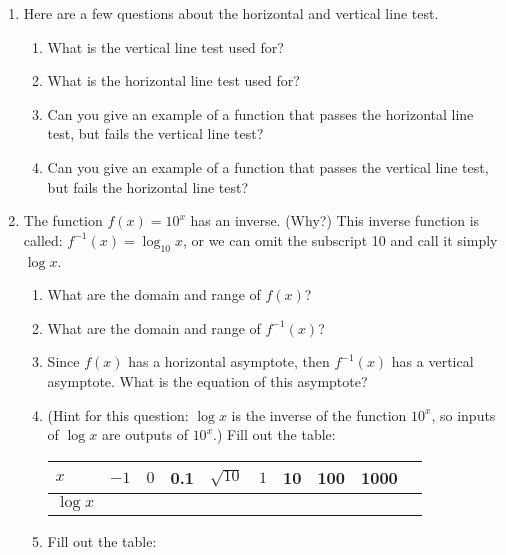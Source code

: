 \documentclass[11pt,dvipsnames]{article}
\begin{document}
\begin{enumerate}[label= {\bf  \arabic*:},resume]
\item Here are a few questions about the horizontal and vertical line test.
\begin{enumerate}
\item What is the vertical line test used for?
\item  What is the horizontal line test used for? 
\item Can you give an example of a function that passes the horizontal line test, but fails the vertical line test?
\item Can you give an example of a function that passes the vertical line test, but fails the horizontal line test?
\end{enumerate}
\item The function $\displaystyle f(x)=10^x$ has an inverse. (Why?) This inverse function is called: $\displaystyle f^{-1}(x)=\log_{10}x$, or we can omit the subscript 10 and call it simply $\displaystyle \log x$.
\begin{enumerate}
	\item What are the domain and range of $f(x)$?
	\item What are the domain and range of $\displaystyle f^{-1}(x)$?
	\item Since $f(x)$ has a horizontal asymptote, then $\displaystyle f^{-1}(x)$ has a vertical asymptote. What is the equation of this asymptote?
	\item  (Hint for this question: $\displaystyle \log x$ is the inverse of the function $\displaystyle 10^x$, so inputs of $\displaystyle \log x$ are outputs of $\displaystyle 10^x$.) Fill out the table:
	
	\begin{minipage}{\linewidth}
		\centering
		
		{\setlength{\tabcolsep}{1.3em}  
			{\renewcommand{\arraystretch}{2}%
				\begin{tabular}{|l|l|l|l|l|l|l|l|l|l|}
					\hline
					$x$    & $-1$ & $0$ & 0.1& $\displaystyle \sqrt{10}$ & $1$ & 10&100&1000  \\ \hline
				$\displaystyle \log x$ &      &     &   &&&&&\\ \hline
				\end{tabular}}} \quad
			\end{minipage}
	\item \label{item:Pasqua1} Fill out the table:
	
		\begin{minipage}{\linewidth}
			\centering
			

\end{minipage}
\end{enumerate}
\end{enumerate}
\end{document}
